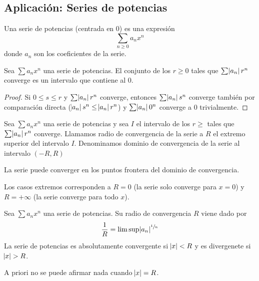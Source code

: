 \subsection{Aplicación: Series de potencias}

\begin{defi}
	Una serie de potencias (centrada en 0) es una expresión
	\[
		\sum_{n \geq 0} a_nx^n
	\]
	donde $a_n$ son los coeficientes de la serie.
\end{defi}

\begin{lema}
	Sea $\sum a_nx^n$ una serie de potencias. El conjunto de los $r \geq 0$ tales
	que $\sum \abs{a_n}r^n$ converge es un intervalo que contiene al 0.
\end{lema}

\begin{proof}
	Si $0 \leq s \leq r$ y $\sum \abs{a_n}r^n$ converge, entonces $\sum \abs{a_n}s^n$
	converge también por comparación directa ($\abs{a_n}s^n \leq \abs{a_n}r^n$) y
	$\sum \abs{a_n}0^n$ converge a 0 trivialmente.
\end{proof}

\begin{defi}
	Sea $\sum a_nx^n$ una serie de potencias y sea $I$ el intervalo de los $r \geq$ tales que
	$\sum \abs{a_n}r^n$ converge. Llamamos radio de convergencia de la serie a $R$ el
	extremo superior del intervalo $I$. Denominamos dominio de convergencia de la serie
	al intervalo $(-R,R)$
\end{defi}

\begin{obs*}
	La serie puede converger en los puntos frontera del dominio de convergencia.
\end{obs*}

\begin{obs*}
	Los casos extremos corresponden a $R = 0$ (la serie solo converge para $x = 0$)
	y $R = +\infty$ (la serie converge para todo $x$).
\end{obs*}

\begin{thm}
	Sea $\sum a_nx^n$ una serie de potencias. Su radio de convergencia $R$ viene dado por
	\[
		\frac{1}{R} = \limsup \abs{a_n}^{\sfrac{1}{n}}
	\]
	La serie de potencias es absolutamente convergente si $\abs{x} < R$ y es divergenete
	si $\abs{x} > R$.
\end{thm}

\begin{obs*}
	A priori no se puede afirmar nada cuando $\abs{x} = R$.
\end{obs*}

